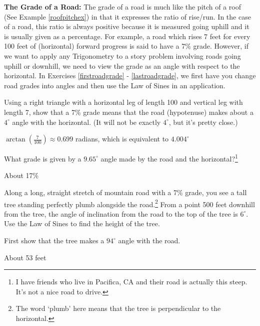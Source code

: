\documentclass{ximera}
\begin{document}
\begin{question}
\label{gradeofroad}
\textbf{The Grade of a Road:} The grade of a road is much like the pitch of a roof (See Example \ref{roofpitchex}) in that it expresses the ratio of rise/run.  In the case of a road, this ratio is always positive because it is measured going uphill and it is usually given as a percentage.  For example, a road which rises 7 feet for every 100 feet of (horizontal) forward progress is said to have a 7\% grade.  However, if we want to apply any Trigonometry to a story problem involving roads going uphill or downhill, we need to view the grade as an angle with respect to the horizontal.  In Exercises \ref{firstroadgrade} - \ref{lastroadgrade}, we first have you change road grades into angles and then use the Law of Sines in an application.


\begin{problem} \label{firstroadgrade}
Using a right triangle with a horizontal leg of length 100 and vertical leg with length 7, show that a 7\% grade means that the road (hypotenuse) makes about a $4^{\circ}$ angle with the horizontal.  (It will not be exactly $4^{\circ}$, but it's pretty close.)

\begin{solution}
$\arctan\left(\frac{7}{100}\right) \approx 0.699$ radians, which is equivalent to $4.004^{\circ}$
\end{solution}
\end{problem}

\begin{problem}
What grade is given by a $9.65^{\circ}$ angle made by the road and the horizontal?\footnote{I have friends who live in Pacifica, CA and their road is actually this steep.  It's not a nice road to drive.}

\begin{solution}
About 17\%
\end{solution}
\end{problem}

\begin{problem}  \label{lastroadgrade}
Along a long, straight stretch of mountain road with a 7\% grade, you see a tall tree standing perfectly plumb alongside the road.\footnote{The word `plumb' here means that the tree is perpendicular to the horizontal.}  From a point 500 feet downhill from the tree, the angle of inclination from the road to the top of the tree is $6^{\circ}$.  Use the Law of Sines to find the height of the tree.

\begin{hint}
First show that the tree makes a $94^{\circ}$ angle with the road.
\end{hint}

\begin{solution}
About 53 feet
\end{solution}
\end{problem}

\end{question}
\end{document}
